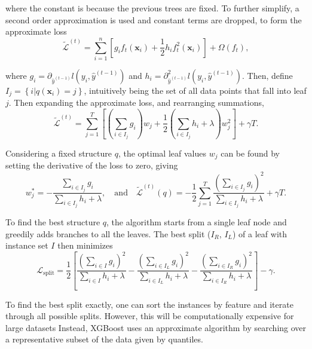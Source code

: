 \documentclass{article}
\begin{document}
where the constant is because the previous trees are fixed. To further simplify, a second order approximation is used and constant terms are dropped, to form the approximate loss
\begin{equation*}
  \tilde{\mathcal{L}}^{(t)} = \sum_{i=1}^n \left[ g_i f_t(\mathbf{x}_i) + \frac{1}{2} h_i f_t^2(\mathbf{x}_i) \right] + \Omega(f_t),
\end{equation*}

where $g_i = \partial_{\hat{y}^{(t-1)}} l(y_i, \hat{y}^{(t-1)})$ and $h_i = \partial_{\hat{y}^{(t-1)}}^2 l(y_i, \hat{y}^{(t-1)})$.
Then, define $I_j = \left\{ i | q(\mathbf{x}_i) = j \right\}$, intuitively being the set of all data points that fall into leaf $j$. Then expanding the approximate loss, and rearranging summations,
\begin{equation*}
  \tilde{\mathcal{L}}^{(t)} = \sum_{j=1}^T \left[ \left( \sum_{i \in I_j} g_i \right) w_j + \frac{1}{2} \left( \sum_{i \in I_j} h_i + \lambda \right) w_j^2 \right] + \gamma T.
\end{equation*}

Considering a fixed structure $q$, the optimal leaf values $w_j$ can be found by setting the derivative of the loss to zero, giving
\begin{equation*}
  w_j^* = -\frac{\sum_{i \in I_j} g_i}{\sum_{i \in I_j} h_i + \lambda}, \quad \text{and} \quad \tilde{\mathcal{L}}^{(t)}(q) = -\frac{1}{2} \sum_{j=1}^T \frac{\left( \sum_{i \in I_j} g_i \right)^2}{\sum_{i \in I_j} h_i + \lambda} + \gamma T.
\end{equation*}

To find the best structure $q$, the algorithm starts from a single leaf node and greedily adds branches to all the leaves. The best split ($I_R$, $I_L$) of a leaf with instance set $I$ then minimizes
\begin{equation*}
  \mathcal{L}_\text{split} = \frac{1}{2} \left[ \frac{\left( \sum_{i \in I} g_i \right)^2}{\sum_{i \in I} h_i + \lambda} - \frac{\left( \sum_{i \in I_L} g_i \right)^2}{\sum_{i \in I_L} h_i + \lambda} - \frac{\left( \sum_{i \in I_R} g_i \right)^2}{\sum_{i \in I_R} h_i + \lambda} \right] - \gamma.
\end{equation*}

To find the best split exactly, one can sort the instances by feature and iterate through all possible splits. However, this will be computationally expensive for large datasets
Instead, XGBoost uses an approximate algorithm by searching over a representative subset of the data given by quantiles.
\end{document}
